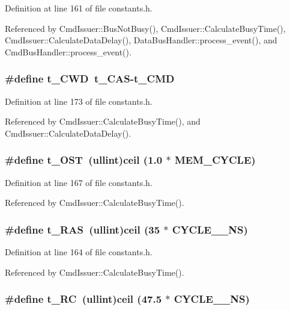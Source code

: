 Definition at line 161 of file constants.h.

Referenced by CmdIssuer::BusNotBusy(), CmdIssuer::CalculateBusyTime(), CmdIssuer::CalculateDataDelay(), DataBusHandler::process\_\-event(), and CmdBusHandler::process\_\-event().
\subsubsection[{t\_\-CWD}]{\setlength{\rightskip}{0pt plus 5cm}\#define t\_\-CWD~t\_\-CAS-t\_\-CMD}\label{constants_8h_eb3062b89e3edd2d47ba039499c11d86}




Definition at line 173 of file constants.h.

Referenced by CmdIssuer::CalculateBusyTime(), and CmdIssuer::CalculateDataDelay().
\subsubsection[{t\_\-OST}]{\setlength{\rightskip}{0pt plus 5cm}\#define t\_\-OST~({\bf ullint})ceil (1.0 $\ast$ MEM\_\-CYCLE)}\label{constants_8h_3c868ed7f1728ac93fd7870fde85c868}




Definition at line 167 of file constants.h.

Referenced by CmdIssuer::CalculateBusyTime().
\subsubsection[{t\_\-RAS}]{\setlength{\rightskip}{0pt plus 5cm}\#define t\_\-RAS~({\bf ullint})ceil (35 $\ast$ CYCLE\_\_\-NS)}\label{constants_8h_bb7e28a6922969171c07a4f6db3554d8}




Definition at line 164 of file constants.h.

Referenced by CmdIssuer::CalculateBusyTime().
\subsubsection[{t\_\-RC}]{\setlength{\rightskip}{0pt plus 5cm}\#define t\_\-RC~({\bf ullint})ceil (47.5 $\ast$ CYCLE\_\_\-NS)}\label{constants_8h_c51f5b19db00f0a249c65fb71718b712}




